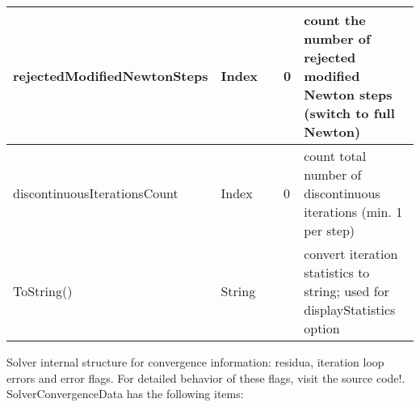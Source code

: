 \begin{center}
\begin{longtable}{| p{4.2cm} | p{2.5cm} | p{0.3cm} | p{3.0cm} | p{6cm} |}
    rejectedModifiedNewtonSteps &     Index &      &     0 &     count the number of rejected modified Newton steps (switch to full Newton)\\ \hline
    discontinuousIterationsCount &     Index &      &     0 &     count total number of discontinuous iterations (min. 1 per step)\\ \hline
    ToString() &     String &      &      &     convert iteration statistics to string; used for displayStatistics option\\ \hline
	  \end{longtable}
	\end{center}

 \label{sec_SolverConvergenceData}
Solver internal structure for convergence information: residua, iteration loop errors and error flags. For detailed behavior of these flags, visit the source code!. \\ 
%
SolverConvergenceData has the following items:
